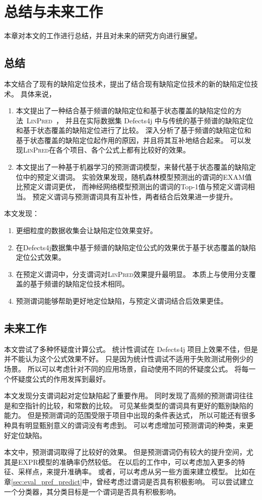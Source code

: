 \chapter{总结与未来工作}

本章对本文的工作进行总结，并且对未来的研究方向进行展望。

\section{总结}

本文结合了现有的缺陷定位技术，提出了结合现有缺陷定位技术的新的缺陷定位技术。
具体来说，
\begin{enumerate}
\item 本文提出了一种结合基于频谱的缺陷定位和基于状态覆盖的缺陷定位的方法~\textsc{LinPred}~，
并且在实际数据集 Defects4j 中与传统的基于频谱的缺陷定位和基于状态覆盖的缺陷定位进行了比较。
深入分析了基于频谱的缺陷定位和基于状态覆盖的缺陷定位起作用的原因，并且将其互补地结合起来。
可以发现\textsc{LinPred}在各个项目、各个公式上都有比较好的效果。
\item 本文提出了一种基于机器学习的预测谓词模型，来替代基于状态覆盖的缺陷定位中的预定义谓词。
实验效果发现，随机森林模型预测出的谓词的EXAM值比预定义谓词更优，
而神经网络模型预测出的谓词的Top-1值与预定义谓词相当。
预定义谓词与预测谓词具有互补性，两者结合后效果进一步提升。
\end{enumerate}

本文发现：
\begin{enumerate}
\item 更细粒度的数据收集会让缺陷定位效果变好。
\item 在Defects4j数据集中基于频谱的缺陷定位公式的效果优于基于状态覆盖的缺陷定位公式效果。
\item 在预定义谓词中，分支谓词对\textsc{LinPred}效果提升最明显。
本质上与使用分支覆盖的基于频谱的缺陷定位技术相同。
\item 预测谓词能够帮助更好地定位缺陷，与预定义谓词结合后效果更佳。
\end{enumerate}

\section{未来工作}

本文尝试了多种怀疑度计算公式。
统计性调试在 Defects4j 项目上效果不佳，但是并不能认为这个公式效果不好。
只是因为统计性调试不适用于失败测试用例少的场景。
所以可以考虑针对不同的应用场景，自动使用不同的怀疑度公式。
将每一个怀疑度公式的作用发挥到最好。

本文发现分支谓词起对定位缺陷起了重要作用。
同时发现了高频的预测谓词往往是和空指针的比较，和常数的比较。
可见某些类型的谓词具有更好的甄别缺陷的能力。
但是预测谓词的范围受限于项目中出现的条件表达式，
所以可能还有很多种具有明显甄别意义的谓词没有考虑到。
可以考虑增加可预测谓词的种类，来更好定位缺陷。

本文中，预测谓词取得了比较好的效果。
但是预测谓词仍有较大的提升空间，尤其是EXPR模型的准确率仍然较低。
在以后的工作中，可以考虑加入更多的特征、采样点，来提升准确率。
或者，可以考虑从另一些方面来建立模型。
比如在章\ref{sec:eval_pref_predict}中，曾经考虑过谓词是否具有积极影响。
可以尝试建立一个分类器，其分类目标是一个谓词是否具有积极影响。
